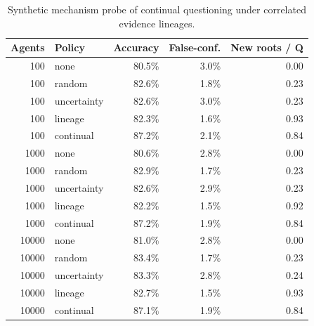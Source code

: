 \begin{table}[t]
\centering
\small
\caption{Synthetic mechanism probe of continual questioning under correlated evidence lineages.}
\label{tab:synthetic-questioning}
\begin{tabular}{r l r r r}
\toprule
Agents & Policy & Accuracy & False-conf. & New roots / Q \\
\midrule
100 & none & 80.5\% & 3.0\% & 0.00 \\
100 & random & 82.6\% & 1.8\% & 0.23 \\
100 & uncertainty & 82.6\% & 3.0\% & 0.23 \\
100 & lineage & 82.3\% & 1.6\% & 0.93 \\
100 & continual & 87.2\% & 2.1\% & 0.84 \\
1000 & none & 80.6\% & 2.8\% & 0.00 \\
1000 & random & 82.9\% & 1.7\% & 0.23 \\
1000 & uncertainty & 82.6\% & 2.9\% & 0.23 \\
1000 & lineage & 82.2\% & 1.5\% & 0.92 \\
1000 & continual & 87.2\% & 1.9\% & 0.84 \\
10000 & none & 81.0\% & 2.8\% & 0.00 \\
10000 & random & 83.4\% & 1.7\% & 0.23 \\
10000 & uncertainty & 83.3\% & 2.8\% & 0.24 \\
10000 & lineage & 82.7\% & 1.5\% & 0.93 \\
10000 & continual & 87.1\% & 1.9\% & 0.84 \\
\bottomrule
\end{tabular}
\end{table}
